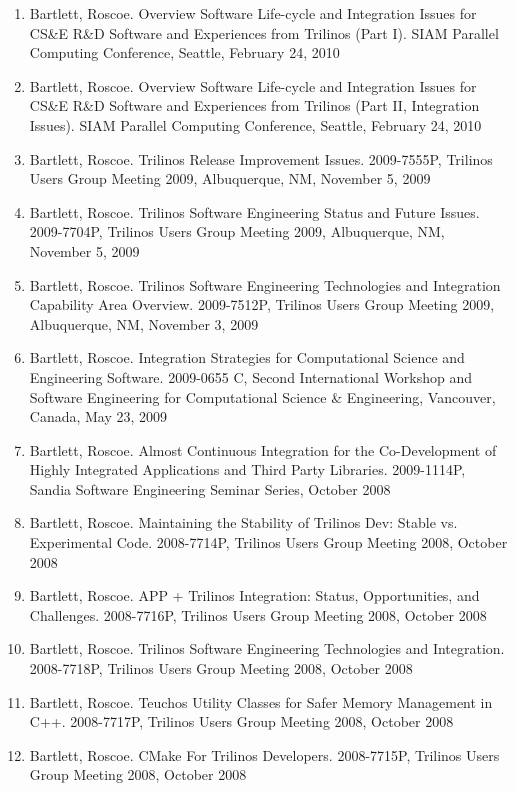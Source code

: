\documentclass{report}
\begin{document}
\begin{enumerate}
%
{}\item Bartlett, Roscoe.  Overview Software Life-cycle and Integration Issues for CS\&E R\&D Software and Experiences from Trilinos (Part I).  SIAM Parallel Computing Conference, Seattle, February 24, 2010
%
{}\item Bartlett, Roscoe.  Overview Software Life-cycle and Integration Issues for CS\&E R\&D Software and Experiences from Trilinos (Part II, Integration Issues).  SIAM Parallel Computing Conference, Seattle, February 24, 2010
%
{}\item Bartlett, Roscoe. Trilinos Release Improvement Issues. 2009-7555P, Trilinos Users Group Meeting 2009, Albuquerque, NM, November 5, 2009
%
{}\item Bartlett, Roscoe. Trilinos Software Engineering Status and Future Issues.  2009-7704P, Trilinos Users Group Meeting 2009, Albuquerque, NM, November 5, 2009
%
{}\item Bartlett, Roscoe. Trilinos Software Engineering Technologies and Integration Capability Area Overview.  2009-7512P, Trilinos Users Group Meeting 2009, Albuquerque, NM, November 3, 2009
%
{}\item Bartlett, Roscoe. Integration Strategies for Computational Science and Engineering Software.  2009-0655 C, Second International Workshop and Software Engineering for Computational Science \& Engineering, Vancouver, Canada, May 23, 2009
%
{}\item Bartlett, Roscoe. Almost Continuous Integration for the Co-Development of Highly Integrated Applications and Third Party Libraries.  2009-1114P, Sandia Software Engineering Seminar Series, October 2008
%
{}\item Bartlett, Roscoe. Maintaining the Stability of Trilinos Dev: Stable vs. Experimental Code.  2008-7714P, Trilinos Users Group Meeting 2008, October 2008
%
{}\item Bartlett, Roscoe. APP + Trilinos Integration: Status, Opportunities, and Challenges.  2008-7716P, Trilinos Users Group Meeting 2008, October 2008
%
{}\item Bartlett, Roscoe. Trilinos Software Engineering Technologies and Integration.  2008-7718P, Trilinos Users Group Meeting 2008, October 2008
%
{}\item Bartlett, Roscoe. Teuchos Utility Classes for Safer Memory Management in C++.  2008-7717P, Trilinos Users Group Meeting 2008, October 2008
%
{}\item Bartlett, Roscoe. CMake For Trilinos Developers.  2008-7715P, Trilinos Users Group Meeting 2008, October 2008

\end{enumerate}
\end{document}
